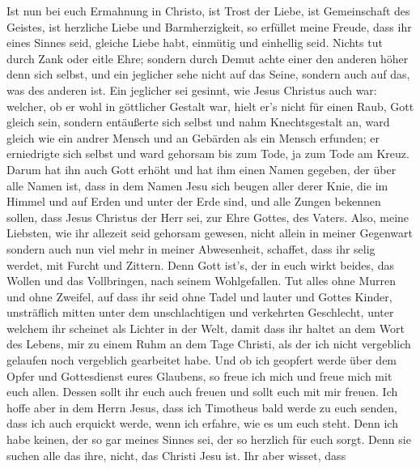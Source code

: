  Ist nun bei euch Ermahnung in Christo, ist Trost der
Liebe, ist Gemeinschaft des Geistes, ist herzliche Liebe und
Barmherzigkeit,  so erfüllet meine Freude, dass ihr eines
Sinnes seid, gleiche Liebe habt, einmütig und einhellig seid.
 Nichts tut durch Zank oder eitle Ehre; sondern durch
Demut achte einer den anderen höher denn sich selbst,  und
ein jeglicher sehe nicht auf das Seine, sondern auch auf das, was des
anderen ist.  Ein jeglicher sei gesinnt, wie Jesus
Christus auch war:  welcher, ob er wohl in göttlicher
Gestalt war, hielt er's nicht für einen Raub, Gott gleich sein,
 sondern entäußerte sich selbst und nahm Knechtsgestalt
an, ward gleich wie ein andrer Mensch und an Gebärden als ein Mensch
erfunden;  er erniedrigte sich selbst und ward gehorsam
bis zum Tode, ja zum Tode am Kreuz.  Darum hat ihn auch
Gott erhöht und hat ihm einen Namen gegeben, der über alle Namen ist,
 dass in dem Namen Jesu sich beugen aller derer Knie, die
im Himmel und auf Erden und unter der Erde sind,  und
alle Zungen bekennen sollen, dass Jesus Christus der Herr sei, zur Ehre
Gottes, des Vaters.  Also, meine Liebsten, wie ihr
allezeit seid gehorsam gewesen, nicht allein in meiner Gegenwart sondern
auch nun viel mehr in meiner Abwesenheit, schaffet, dass ihr selig
werdet, mit Furcht und Zittern.  Denn Gott ist's, der in
euch wirkt beides, das Wollen und das Vollbringen, nach seinem
Wohlgefallen.  Tut alles ohne Murren und ohne Zweifel,
 auf dass ihr seid ohne Tadel und lauter und Gottes
Kinder, unsträflich mitten unter dem unschlachtigen und verkehrten
Geschlecht, unter welchem ihr scheinet als Lichter in der Welt,
 damit dass ihr haltet an dem Wort des Lebens, mir zu
einem Ruhm an dem Tage Christi, als der ich nicht vergeblich gelaufen
noch vergeblich gearbeitet habe.  Und ob ich geopfert
werde über dem Opfer und Gottesdienst eures Glaubens, so freue ich mich
und freue mich mit euch allen.  Dessen sollt ihr euch
auch freuen und sollt euch mit mir freuen.  Ich hoffe
aber in dem Herrn Jesus, dass ich Timotheus bald werde zu euch senden,
dass ich auch erquickt werde, wenn ich erfahre, wie es um euch steht.
 Denn ich habe keinen, der so gar meines Sinnes sei, der
so herzlich für euch sorgt.  Denn sie suchen alle das
ihre, nicht, das Christi Jesu ist.  Ihr aber wisset, dass
